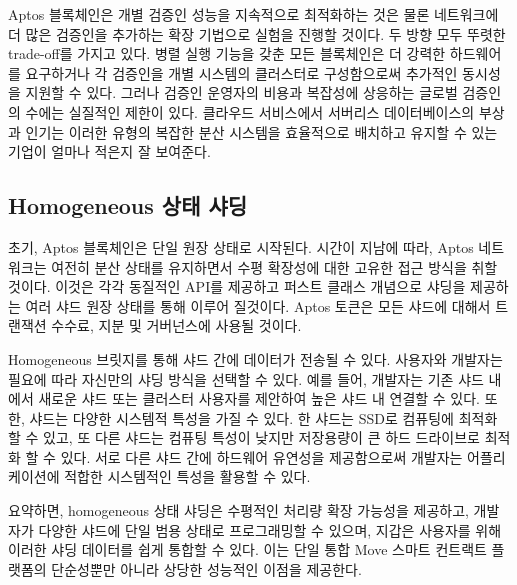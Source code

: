 \documentclass{article}
\begin{document}
Aptos 블록체인은 개별 검증인 성능을 지속적으로 최적화하는 것은 물론 네트워크에 더 많은 검증인을 추가하는 확장 기법으로 실험을 진행할 것이다. 두 방향 모두 뚜렷한 trade-off를 가지고 있다. 병렬 실행 기능을 갖춘 모든 블록체인은 더 강력한 하드웨어를 요구하거나 각 검증인을 개별 시스템의 클러스터로 구성함으로써 추가적인 동시성을 지원할 수 있다. 그러나 검증인 운영자의 비용과 복잡성에 상응하는 글로벌 검증인의 수에는 실질적인 제한이 있다. 클라우드 서비스에서 서버리스 데이터베이스의 부상과 인기는 이러한 유형의 복잡한 분산 시스템을 효율적으로 배치하고 유지할 수 있는 기업이 얼마나 적은지 잘 보여준다.

\subsection{Homogeneous 상태 샤딩}

초기, Aptos 블록체인은 단일 원장 상태로 시작된다. 시간이 지남에 따라, Aptos 네트워크는 여전히 분산 상태를 유지하면서 수평 확장성에 대한 고유한 접근 방식을 취할 것이다. 이것은 각각 동질적인 API를 제공하고 퍼스트 클래스 개념으로 샤딩을 제공하는 여러 샤드 원장 상태를 통해 이루어 질것이다. Aptos 토큰은 모든 샤드에 대해서 트랜잭션 수수료, 지분 및 거버넌스에 사용될 것이다.

Homogeneous 브릿지를 통해 샤드 간에 데이터가 전송될 수 있다. 사용자와 개발자는 필요에 따라 자신만의 샤딩 방식을 선택할 수 있다. 예를 들어, 개발자는 기존 샤드 내에서 새로운 샤드 또는 클러스터 사용자를 제안하여 높은 샤드 내 연결할 수 있다. 또한, 샤드는 다양한 시스템적 특성을 가질 수 있다. 한 샤드는 SSD로 컴퓨팅에 최적화 할 수 있고, 또 다른 샤드는 컴퓨팅 특성이 낮지만 저장용량이 큰 하드 드라이브로 최적화 할 수 있다. 서로 다른 샤드 간에 하드웨어 유연성을 제공함으로써 개발자는 어플리케이션에 적합한 시스템적인 특성을 활용할 수 있다.

요약하면, homogeneous 상태 샤딩은 수평적인 처리량 확장 가능성을 제공하고, 개발자가 다양한 샤드에 단일 범용 상태로 프로그래밍할 수 있으며, 지갑은 사용자를 위해 이러한 샤딩 데이터를 쉽게 통합할 수 있다. 이는 단일 통합 Move 스마트 컨트랙트 플랫폼의 단순성뿐만 아니라 상당한 성능적인 이점을 제공한다.


\small{

}
\end{document}

